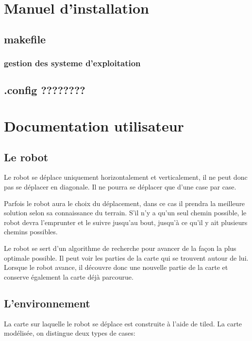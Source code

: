 \documentclass[a4paper 12pts]{article}
\begin{document}
\section{Manuel d'installation}

\subsection{makefile}

\subsubsection{gestion des systeme d'exploitation}

\subsection{.config ????????}


\section{Documentation utilisateur}

\subsection{Le robot}
Le robot se déplace uniquement horizontalement et verticalement, il ne peut donc pas se déplacer en diagonale. Il ne pourra se déplacer que d'une case par case.

Parfois le robot aura le choix du déplacement, dans ce cas il prendra la meilleure solution selon sa connaissance du terrain. S'il n'y a qu'un seul chemin possible, le robot devra l'emprunter et le suivre jusqu'au bout, jusqu'à ce qu'il y ait plusieurs chemins possibles.

Le robot se sert d'un algorithme de recherche pour avancer de la façon la plus optimale possible. Il peut voir les parties de la carte qui se trouvent autour de lui. 
Lorsque le robot avance, il découvre donc une nouvelle partie de la carte et conserve également la carte déjà parcourue.

\subsection{L'environnement}
La carte sur laquelle le robot se déplace est construite à l'aide de tiled. La carte modélisée, on distingue deux types de cases:
\end{document}
